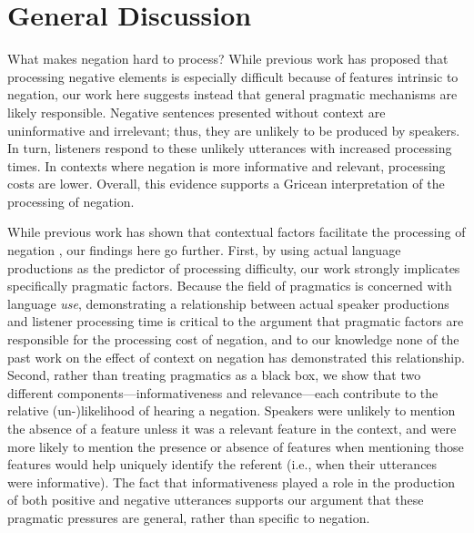 \documentclass[man, noapacite]{apa2}
\begin{document}
\section{General Discussion}

What makes negation hard to process? While previous work has proposed that processing negative elements is especially difficult because of features intrinsic to negation, our work here suggests instead that general pragmatic mechanisms are likely responsible. Negative sentences presented without context are uninformative and irrelevant; thus, they are unlikely to be produced by speakers. In turn, listeners respond to these unlikely utterances with increased processing times. In contexts where negation is more informative and relevant, processing costs are lower. Overall, this evidence supports a Gricean interpretation of the processing of negation.

While previous work has shown that contextual factors facilitate the processing of negation \cite{wason1965,nieuwland2008,dale2011,orenes2014}, our findings here go further. First, by using actual language productions as the predictor of processing difficulty, our work strongly implicates specifically pragmatic factors. Because the field of pragmatics is concerned with language \emph{use}, demonstrating a relationship between actual speaker productions and listener processing time is critical to the argument that pragmatic factors are responsible for the processing cost of negation, and to our knowledge none of the past work on the effect of context on negation has demonstrated this relationship. Second, rather than treating pragmatics as a black box, we show that two different components---informativeness and relevance---each contribute to the relative (un-)likelihood of hearing a negation. Speakers were unlikely to mention the absence of a feature unless it was a relevant feature in the context, and were more likely to mention the presence or absence of features when mentioning those features would help uniquely identify the referent (i.e., when their utterances were informative). The fact that informativeness played a role in the production of both positive and negative utterances supports our argument that these pragmatic pressures are general, rather than specific to negation. 
\end{document}
